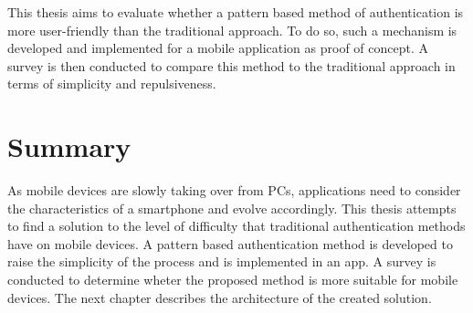 This thesis aims to evaluate whether a pattern based method of authentication is more user-friendly than the traditional approach. To do so, such a mechanism is developed and implemented for a mobile application as proof of concept. A survey is then conducted to compare this method to the traditional approach in terms of simplicity and repulsiveness. 

\section{Summary}

As mobile devices are slowly taking over from PCs, applications need to consider the characteristics of a smartphone and evolve accordingly. This thesis attempts to find a solution to the level of difficulty that traditional authentication methods have on mobile devices. A pattern based authentication method is developed to raise the simplicity of the process and is implemented in an app. A survey is conducted to determine wheter the proposed method is more suitable for mobile devices. The next chapter describes the architecture of the created solution. 




